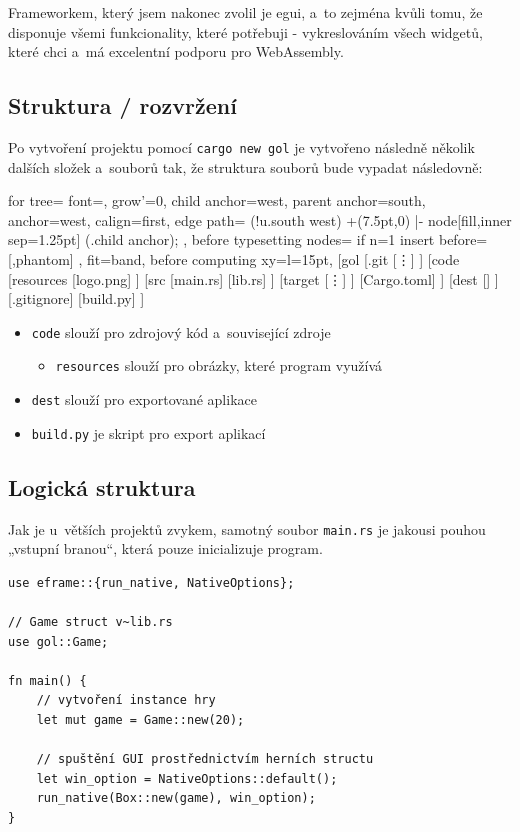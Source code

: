 \documentclass[a4paper, 12pt, twoside]{article} %
\begin{document}
		Frameworkem, který jsem nakonec zvolil je egui, a~to zejména kvůli tomu, že disponuje všemi funkcionality, které potřebuji - vykreslováním všech widgetů, které chci a~má excelentní podporu pro WebAssembly.\cite{egui}
	
	\subsection{Struktura / rozvržení}
		Po vytvoření projektu pomocí \texttt{cargo new gol} je vytvořeno následně několik dalších složek a~souborů tak, že struktura souborů bude vypadat následovně:
		\begin{center}
		\begin{forest}
			for tree={
			font=\ttfamily,
			grow'=0,
			child anchor=west,
			parent anchor=south,
			anchor=west,
			calign=first,
			edge path={
				\noexpand{}
				(!u.south west) +(7.5pt,0) |- node[fill,inner sep=1.25pt] {} (.child anchor);
			},
			before typesetting nodes={
				if n=1
				{insert before={[,phantom]}}
				{}
			},
			fit=band,
			before computing xy={l=15pt},
			}
		[gol
			[.git
			[\vdots]
			]
			[code
			[resources
				[logo.png]
			]
			[src
				[main.rs]
				[lib.rs]
			]
			[target
				[\vdots]
			]
			[Cargo.toml]
			]
			[dest
			[]
			]
			[.gitignore]
			[build.py]
		]
		\end{forest}
		\end{center}

		\begin{itemize}
			\item \texttt{code} slouží pro zdrojový kód a~související zdroje
			\begin{itemize}
				\item \texttt{resources} slouží pro obrázky, které program využívá
			\end{itemize}
			\item \texttt{dest} slouží pro exportované aplikace
			\item \texttt{build.py} je skript pro export aplikací
		\end{itemize}
		
	\subsection{Logická struktura}
		Jak je u~větších projektů zvykem, samotný soubor \texttt{main.rs} je jakousi pouhou „vstupní branou“, která pouze inicializuje program. 
		
		\begin{verbatim}
use eframe::{run_native, NativeOptions};

// Game struct v~lib.rs
use gol::Game;

fn main() {
	// vytvoření instance hry
	let mut game = Game::new(20);

	// spuštění GUI prostřednictvím herních structu
	let win_option = NativeOptions::default();
	run_native(Box::new(game), win_option);
}
		\end{verbatim}
		
\end{document}
